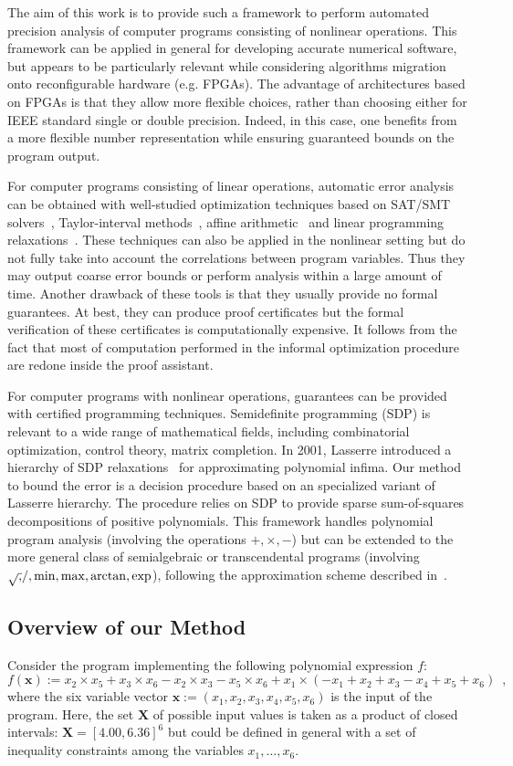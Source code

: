 \documentclass[a4paper,10pt]{article}
\newcommand{\x}{\mathbf{x}}
\def\X{\mathbf{X}}
\theoremstyle{plain}
\theoremstyle{definition}
\theoremstyle{remark}
\begin{document}
The aim of this work is to provide such a framework to perform automated precision analysis of computer programs consisting of nonlinear operations. 
This framework can be applied in general for developing accurate numerical software, but appears to be particularly relevant while considering algorithms migration onto reconfigurable hardware (e.g. FPGAs). The advantage of architectures based on FPGAs is that they allow more flexible choices, rather than choosing either for IEEE standard single or double precision. Indeed, in this case, one benefits from a more flexible number representation while ensuring guaranteed bounds on the program output. 

For computer programs consisting of linear operations, automatic error analysis can be obtained with well-studied optimization techniques based on SAT/SMT solvers~\cite{Darulova14Popl,hgbk2012fmcad}, Taylor-interval methods~\cite{fptaylor15}, affine arithmetic~\cite{fluctuat} and linear programming relaxations~\cite{Boland10HGR}.
These techniques can also be applied in the nonlinear setting but do not fully take into account the correlations between program variables. Thus they may output coarse error bounds or perform analysis within a large amount of time.  Another drawback of these tools is that they usually provide no formal guarantees. At best, they can produce proof certificates but the formal verification of these certificates is computationally expensive. It follows from the fact that most of computation performed in the informal optimization procedure are redone inside the proof assistant.

For computer programs with nonlinear operations, guarantees can be provided with certified programming techniques.
Semidefinite programming (SDP) is relevant to a wide range of mathematical fields, including combinatorial optimization, control theory, matrix completion. In 2001, Lasserre introduced a hierarchy of SDP relaxations~\cite{Lasserre01moments} for approximating polynomial infima. Our method to bound the error is a decision procedure based on an specialized variant of Lasserre hierarchy. The procedure relies on SDP to provide sparse sum-of-squares decompositions of positive polynomials. This framework handles polynomial program analysis (involving the operations $+,\times,-$) but can be extended to the more general class of semialgebraic or transcendental programs (involving $\sqrtsign, /, \min, \max, \arctan, \exp$), following the approximation scheme described in~\cite{Magron15sdp}.

\subsection{Overview of our Method}
%
Consider the program implementing the following polynomial expression $f$:
\[ f(\x) := x_2 \times x_5 + x_3 \times x_6 - x_2 \times x_3  - x_5 \times x_6 + x_1 \times ( - x_1 +  x_2 +  x_3  - x_4 +  x_5 +  x_6) \enspace, \]
where the six variable vector $\x :=  (x_1, x_2, x_3, x_4, x_5, x_6)$ is the input of the program. Here, the set $\X$ of possible input values is taken as a product of closed intervals: $\X = [4.00, 6.36]^6$ but could be defined in general with a set of inequality constraints among the variables $x_1, \dots, x_6$. 
\end{document}
